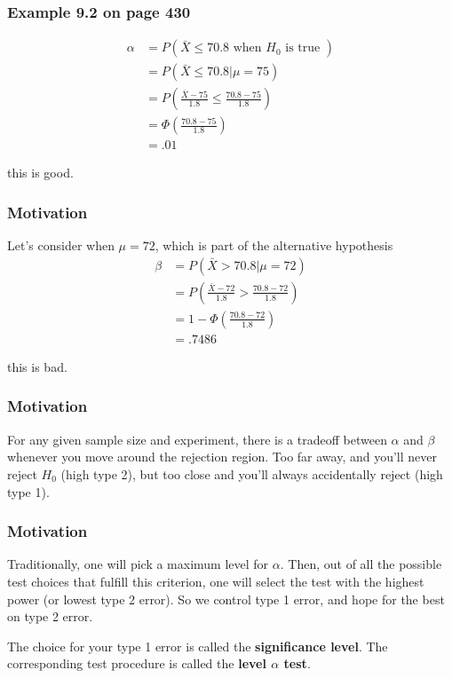 \documentclass{beamer}
\begin{document}
\begin{frame}
\frametitle{Example 9.2 on page 430}

\begin{align*}
\alpha &= P(\bar{X} \le 70.8 \text{ when $H_0$ is true })\\
&= P(\bar{X} \le 70.8 | \mu = 75)\\
&= P \left( \frac{\bar{X} - 75}{1.8} \le \frac{70.8 - 75}{1.8} \right) \\
&= \Phi \left( \frac{70.8 - 75}{1.8} \right) \\
&= .01
\end{align*}


this is good.
\end{frame}


\begin{frame}
\frametitle{Motivation}

Let's consider when $\mu = 72$, which is part of the alternative hypothesis
\begin{align*}
\beta &= P(\bar{X} > 70.8 | \mu = 72)\\
&= P \left( \frac{\bar{X} - 72}{1.8} > \frac{70.8 - 72}{1.8} \right) \\
&= 1 - \Phi \left( \frac{70.8 - 72}{1.8} \right) \\
&= .7486
\end{align*}

this is bad.
\end{frame}


\begin{frame}
\frametitle{Motivation}

For any given sample size and experiment, there is a tradeoff between $\alpha$ and $\beta$ whenever you move around the rejection region. Too far away, and you'll never reject $H_0$ (high type 2), but too close and you'll always accidentally reject (high type 1).

\end{frame}

\begin{frame}
\frametitle{Motivation}

Traditionally, one will pick a maximum level for $\alpha$. Then, out of all the possible test choices that fulfill this criterion, one will select the test with the highest power (or lowest type 2 error). So we control type 1 error, and hope for the best on type 2 error.
\newline

The choice for your type 1 error is called the \textbf{significance level}. The corresponding test procedure is called the \textbf{level $\alpha$ test}.

\end{frame}
\end{document}
